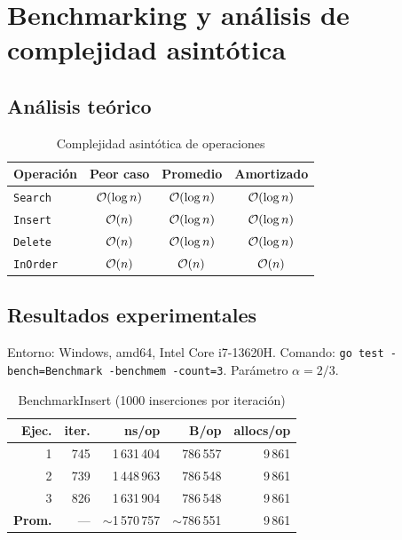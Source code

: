 \chapter{Benchmarking y análisis de complejidad asintótica}

\section{Análisis teórico}

\begin{table}[H]
  \centering
  \caption{Complejidad asintótica de operaciones}
  \begin{tabular}{@{}lccc@{}}
    \toprule
    \textbf{Operación} & \textbf{Peor caso} & \textbf{Promedio} & \textbf{Amortizado} \\
    \midrule
    \texttt{Search} & $\mathcal{O}(\log n)$ & $\mathcal{O}(\log n)$ & $\mathcal{O}(\log n)$ \\
    \texttt{Insert} & $\mathcal{O}(n)$ & $\mathcal{O}(\log n)$ & $\mathcal{O}(\log n)$ \\
    \texttt{Delete} & $\mathcal{O}(n)$ & $\mathcal{O}(\log n)$ & $\mathcal{O}(\log n)$ \\
    \texttt{InOrder} & $\mathcal{O}(n)$ & $\mathcal{O}(n)$ & $\mathcal{O}(n)$ \\
    \bottomrule
  \end{tabular}
\end{table}

\section{Resultados experimentales}

Entorno: Windows, amd64, Intel Core i7-13620H. Comando: \texttt{go test -bench=Benchmark -benchmem -count=3}. Parámetro $\alpha = 2/3$.

\begin{table}[H]
  \centering
  \caption{BenchmarkInsert (1000 inserciones por iteración)}
  \begin{tabular}{@{}rrrrr@{}}
    \toprule
    \textbf{Ejec.} & \textbf{iter.} & \textbf{ns/op} & \textbf{B/op} & \textbf{allocs/op} \\
    \midrule
    1 & 745 & 1\,631\,404 & 786\,557 & 9\,861 \\
    2 & 739 & 1\,448\,963 & 786\,548 & 9\,861 \\
    3 & 826 & 1\,631\,904 & 786\,548 & 9\,861 \\
    \midrule
    \textbf{Prom.} & --- & $\sim$1\,570\,757 & $\sim$786\,551 & 9\,861 \\
    \bottomrule
  \end{tabular}
\end{table}

